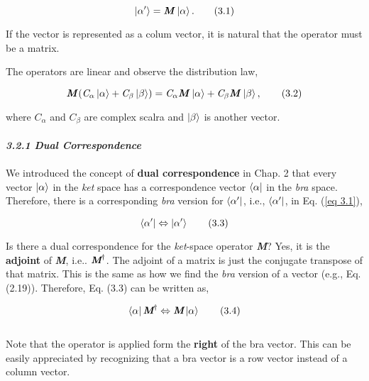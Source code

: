 \documentclass{article}
\begin{document}
\begin{equation} \label{eq 3.1}
    \ket{\alpha^\prime}= \textbf{\textit{M}} \ket{\alpha}. \tag{3.1}
\end{equation}


If the vector is represented as a colum vector, it is natural that the operator must be a matrix.

The operators are linear and observe the distribution law,

\begin{equation} \label{eq 3.2}
    \textbf{\textit{M}} (\textit{C}_{\alpha}\ket{\alpha}+ \textit{C}_{\beta}\ket{\beta})=\textit{C}_{\alpha}
\textbf{\textit{M}} \ket{\alpha}+\textit{C}_{\beta}\textbf{\textit{M}}\ket{\beta}, \tag{3.2}
\end{equation}

where $\textit{C}_{\alpha}$ and $\textit{C}_{\beta}$ are complex scalra and $\ket{\beta}$ is another vector.
\\
\\
\textit{\textbf{\large 3.2.1 Dual Correspondence}}
\\
\\
We introduced the concept of \textbf{dual correspondence} in Chap. 2 that every vector $\ket{\alpha}$
in the \textit{ket} space has a correspondence vector $\bra{\alpha}$ in the \textit{bra} space. Therefore,
there is a corresponding \textit{bra} version for $\bra{\alpha^{\prime}}$, i.e., $\bra{\alpha^{\prime}}$,
in Eq. (\ref{eq 3.1}),

\begin{equation}
    \bra{\alpha^{\prime}} \Leftrightarrow \ket{\alpha^{\prime}} \tag{3.3}
\end{equation}

Is there a dual correspondence for the \textit{ket}-space operator \textit{\textbf{M}}?
Yes, it is the \textbf{adjoint} of \textit{\textbf{M}}, i.e.. $\textit{\textbf{M}}^{\dagger}$.
The adjoint of a matrix is just the conjugate transpose of that matrix. This is the same as how we find
the \textit{bra} version of a vector (e.g., Eq.(2.19)). Therefore, Eq. (3.3) can be written as,

\begin{equation} \label{eq 3.4}
    \bra{\alpha}\textit{\textbf{M}}^{\dagger}\Leftrightarrow\textit{\textbf{M}}\ket{\alpha} \tag{3.4}
\end{equation}
\\
Note that the operator is applied form the \textbf{right} of the bra vector.
This can be easily appreciated by recognizing that a bra vector is a row vector instead of a column vector.
\end{document}
